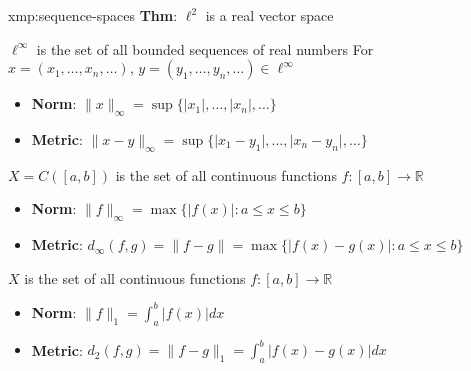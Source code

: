 \documentclass[landscape, 8pt]{extarticle}
\begin{document}
\begin{multicols}{3}
\begin{xmp}{xmp:sequence-spaces}{}
    \vspace{-3pt}
    \textbf{Thm}: $\ell^{2}$ is a real vector space


    $\ell^{\infty}$ is the set of all bounded sequences of real numbers
    For $x = (x_{1},\dots,x_{n},\dots),\,y = (y_{1},\dots,y_{n},\dots)\in \ell^{\infty}$
    \vspace{-3pt}
    \begin{itemize}[leftmargin=*]
        \item \textbf{Norm}: $\lVert x \rVert_{\infty} = \sup \{\lvert x_{1} \rvert,\dots,\lvert x_{n} \rvert,\dots\}$
        \item \textbf{Metric}: $\lVert x - y \rVert_{\infty} = \sup \{\lvert x_{1} - y_{1} \rvert,\dots,\lvert x_{n} - y_{n} \rvert,\dots\}$
    \end{itemize}

    \vspace{-3pt}

    $X = C([a, b])$ is the set of all continuous functions $f : [a, b]\to \mathbb{R}$
    \vspace{-3pt}
    \begin{itemize}[leftmargin=*]
        \item \textbf{Norm}: $\lVert f \rVert_{\infty} = \max \{ \lvert f(x) \rvert : a \le x \le b\}$
        \item \textbf{Metric}: $d_{\infty}(f, g) = \lVert f - g \rVert = \max \{\lvert f(x) - g(x) \rvert : a \le x \le b\}$
    \end{itemize}

    \vspace{-3pt}

    $X$ is the set of all continuous functions $f : [a, b] \to \mathbb{R}$
    \vspace{-3pt}
    \begin{itemize}
        \item \textbf{Norm}: $\lVert f \rVert_{1} = \int_{a}^{b} \lvert f(x) \rvert dx$
        \item \textbf{Metric}: $d_{2}(f, g) = \lVert f - g \rVert_{1} = \int_{a}^{b} \lvert f(x) - g(x) \rvert dx$
    \end{itemize}
    \vspace{-3pt}



\end{xmp}
\end{multicols}
\end{document}
